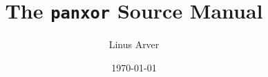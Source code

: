 \documentclass[letterpaper,twoside,12pt]{article}
\begin{document}
\title{The \texttt{panxor} Source Manual}
\author{Linus Arver}
\date{\today}
\maketitle
\tableofcontents


\end{document}
